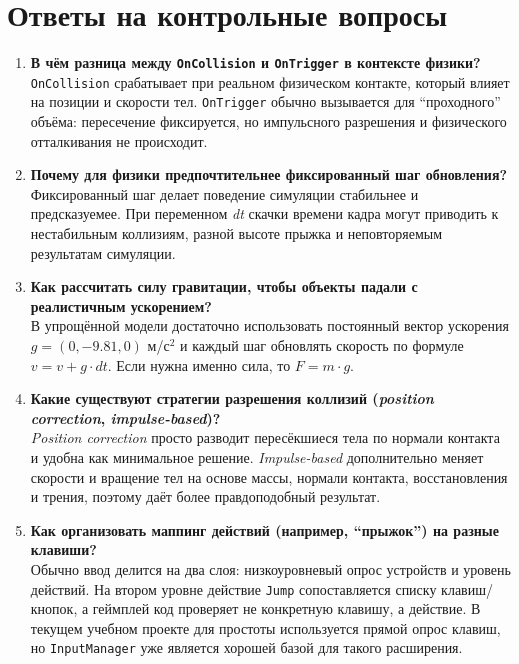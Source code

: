 \documentclass[a4paper,14pt]{extarticle}
\begin{document}
\section{Ответы на контрольные вопросы}
\begin{enumerate}
  \item \textbf{В чём разница между \texttt{OnCollision} и \texttt{OnTrigger} в контексте физики?}\\
  \texttt{OnCollision} срабатывает при реальном физическом контакте, который влияет на позиции и скорости тел. \texttt{OnTrigger} обычно вызывается для ``проходного'' объёма: пересечение фиксируется, но импульсного разрешения и физического отталкивания не происходит.

  \item \textbf{Почему для физики предпочтительнее фиксированный шаг обновления?}\\
  Фиксированный шаг делает поведение симуляции стабильнее и предсказуемее. При переменном \textit{dt} скачки времени кадра могут приводить к нестабильным коллизиям, разной высоте прыжка и неповторяемым результатам симуляции.

  \item \textbf{Как рассчитать силу гравитации, чтобы объекты падали с реалистичным ускорением?}\\
  В упрощённой модели достаточно использовать постоянный вектор ускорения \(g = (0, -9.81, 0)\) м/с\(^2\) и каждый шаг обновлять скорость по формуле \(v = v + g \cdot dt\). Если нужна именно сила, то \(F = m \cdot g\).

  \item \textbf{Какие существуют стратегии разрешения коллизий (\textit{position correction}, \textit{impulse-based})?}\\
  \textit{Position correction} просто разводит пересёкшиеся тела по нормали контакта и удобна как минимальное решение. \textit{Impulse-based} дополнительно меняет скорости и вращение тел на основе массы, нормали контакта, восстановления и трения, поэтому даёт более правдоподобный результат.

  \item \textbf{Как организовать маппинг действий (например, ``прыжок'') на разные клавиши?}\\
  Обычно ввод делится на два слоя: низкоуровневый опрос устройств и уровень действий. На втором уровне действие \texttt{Jump} сопоставляется списку клавиш/кнопок, а геймплей код проверяет не конкретную клавишу, а действие. В текущем учебном проекте для простоты используется прямой опрос клавиш, но \texttt{InputManager} уже является хорошей базой для такого расширения.


\end{enumerate}
\end{document}
